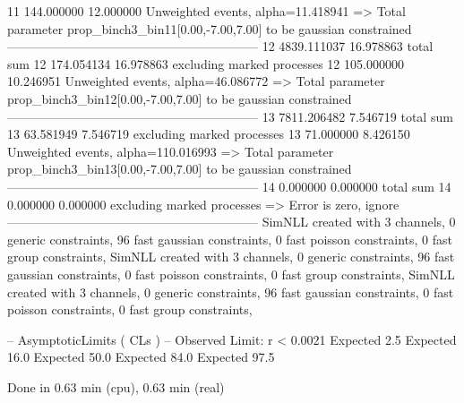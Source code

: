 11         144.000000      12.000000       Unweighted events, alpha=11.418941
  => Total parameter prop_binch3_bin11[0.00,-7.00,7.00] to be gaussian constrained
------------------------------------------------------------
12         4839.111037     16.978863       total sum                     
12         174.054134      16.978863       excluding marked processes    
12         105.000000      10.246951       Unweighted events, alpha=46.086772
  => Total parameter prop_binch3_bin12[0.00,-7.00,7.00] to be gaussian constrained
------------------------------------------------------------
13         7811.206482     7.546719        total sum                     
13         63.581949       7.546719        excluding marked processes    
13         71.000000       8.426150        Unweighted events, alpha=110.016993
  => Total parameter prop_binch3_bin13[0.00,-7.00,7.00] to be gaussian constrained
------------------------------------------------------------
14         0.000000        0.000000        total sum                     
14         0.000000        0.000000        excluding marked processes    
  => Error is zero, ignore      
------------------------------------------------------------
SimNLL created with 3 channels, 0 generic constraints, 96 fast gaussian constraints, 0 fast poisson constraints, 0 fast group constraints, 
SimNLL created with 3 channels, 0 generic constraints, 96 fast gaussian constraints, 0 fast poisson constraints, 0 fast group constraints, 
SimNLL created with 3 channels, 0 generic constraints, 96 fast gaussian constraints, 0 fast poisson constraints, 0 fast group constraints, 

 -- AsymptoticLimits ( CLs ) --
Observed Limit: r < 0.0021
Expected  2.5%
Expected 16.0%
Expected 50.0%
Expected 84.0%
Expected 97.5%

Done in 0.63 min (cpu), 0.63 min (real)
